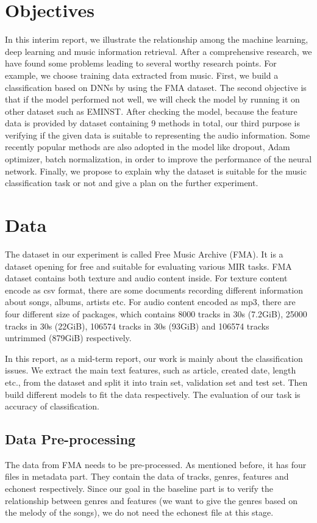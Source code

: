 \documentclass{article}
\begin{document}
\section{Objectives}
In this interim report, we illustrate the relationship among the machine learning, deep learning and music information retrieval. After a comprehensive research, we have found some problems leading to several worthy research points. For example, we choose training data extracted from music. First, we build a classification based on DNNs by using the FMA dataset. The second objective is that if the model performed not well, we will check the model by running it on other dataset such as EMINST. After checking the model, because the feature data is provided by dataset containing 9 methods in total, our third purpose is verifying if the given data is suitable to representing the audio information. Some recently popular methods are also adopted in the model like dropout, Adam optimizer, batch normalization, in order to improve the performance of the neural network. Finally, we propose to explain why the dataset is suitable for the music classification task or not and give a plan on the further experiment.


\section{Data}
The dataset in our experiment is called Free Music Archive (FMA). It is a dataset opening for free and suitable for evaluating various MIR tasks. FMA dataset contains both texture and audio content inside. For texture content encode as csv format, there are some documents recording different information about songs, albums, artists etc. For audio content encoded as mp3, there are four different size of packages, which contains 8000 tracks in 30s (7.2GiB), 25000 tracks in 30s (22GiB), 106574 tracks in 30s (93GiB) and 106574 tracks untrimmed (879GiB) respectively. 

In this report, as a mid-term report, our work is mainly about the classification issues. We extract the main text features, such as article, created date, length etc., from the dataset and split it into train set, validation set and test set. Then build different models to fit the data respectively. The evaluation of our task is accuracy of classification.

\subsection{Data Pre-processing}
The data from FMA needs to be pre-processed. As mentioned before, it has four files in metadata part. They contain the data of tracks, genres, features and echonest respectively. Since our goal in the baseline part is to verify the relationship between genres and features (we want to give the genres based on the melody of the songs), we do not need the echonest file at this stage.
\end{document}
